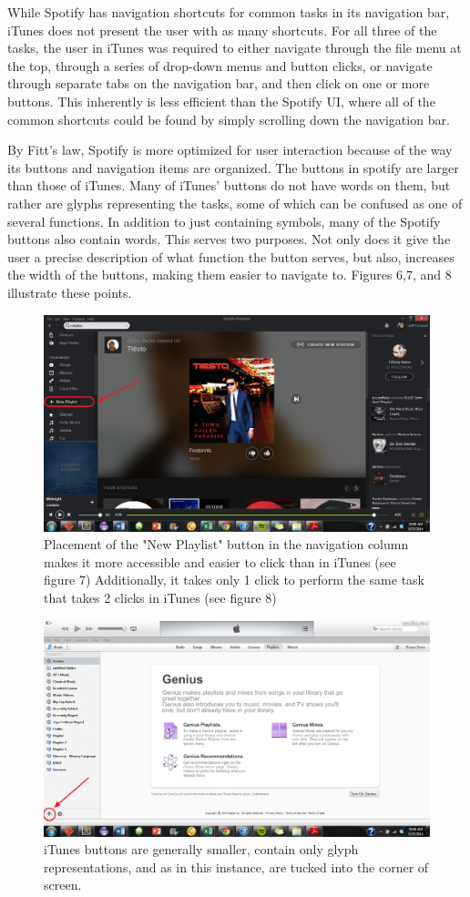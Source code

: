 \documentclass[12pt]{report}
\begin{document}
While Spotify has navigation shortcuts for common tasks in its navigation bar, iTunes does not present the user with as many shortcuts. For all three of the tasks, the user in iTunes was required to either navigate through the file menu at the top, through a series of drop-down menus and button clicks, or navigate through separate tabs on the navigation bar, and then click on one or more buttons. This inherently is less efficient than the Spotify UI, where all of the common shortcuts could be found by simply scrolling down the navigation bar. 

By Fitt's law, Spotify is more optimized for user interaction because of the way its buttons and navigation items are organized. The buttons in spotify are larger than those of iTunes. Many of iTunes' buttons do not have words on them, but rather are glyphs representing the tasks, some of which can be confused as one of several functions. In addition to just containing symbols, many of the Spotify buttons also contain words. This serves two purposes. Not only does it give the user a precise description of what function the button serves, but also, increases the width of the buttons, making them easier to navigate to. Figures 6,7, and 8 illustrate these points.

\begin{figure}[H]
	\centering
	\includegraphics[width=.75\textwidth]{chart8.png}
	\caption{Placement of the "New Playlist" button in the navigation column makes it more accessible and easier to click than in iTunes (see figure 7) Additionally, it takes only 1 click to perform the same task that takes 2 clicks in iTunes (see figure 8)}
\end{figure}

\begin{figure}[H]
	\centering
	\includegraphics[width=.75\textwidth]{chart7.png}
	\caption{iTunes buttons are generally smaller, contain only glyph representations, and as in this instance, are tucked into the corner of screen.}
\end{figure}
\end{document}
